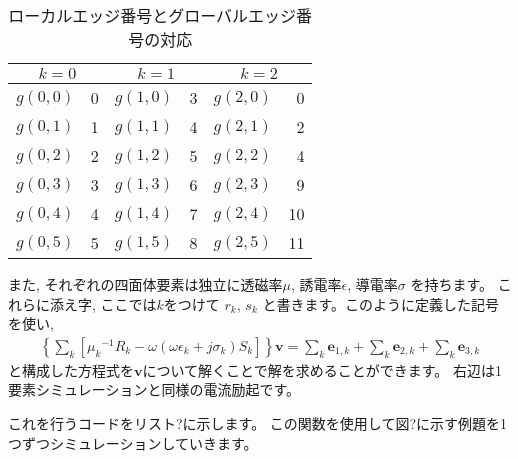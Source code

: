 \begin{table}[tbp]
\caption{ローカルエッジ番号とグローバルエッジ番号の対応}
\label{tab:local2global}
\begin{center}
\begin{tabular}{|l|r|l|r|l|r|}
\hline
\multicolumn{2}{|c|}{$k=0$}&
\multicolumn{2}{|c|}{$k=1$}&
\multicolumn{2}{|c|}{$k=2$}\\
\hline
$g(0, 0)$ & 0 & $g(1, 0)$ & 3 & $g(2, 0)$ &  0 \\
$g(0, 1)$ & 1 & $g(1, 1)$ & 4 & $g(2, 1)$ &  2 \\
$g(0, 2)$ & 2 & $g(1, 2)$ & 5 & $g(2, 2)$ &  4 \\
$g(0, 3)$ & 3 & $g(1, 3)$ & 6 & $g(2, 3)$ &  9 \\
$g(0, 4)$ & 4 & $g(1, 4)$ & 7 & $g(2, 4)$ & 10 \\
$g(0, 5)$ & 5 & $g(1, 5)$ & 8 & $g(2, 5)$ & 11 \\
\hline
\end{tabular}
\end{center}
\end{table}

また, それぞれの四面体要素は独立に透磁率$\mu$, 誘電率$\epsilon$, 導電率$\sigma$
を持ちます。
これらに添え字, ここでは$k$をつけて
$r_k$, $s_k$%
と書きます。このように定義した記号を使い,
\begin{align}
\left\{
\sum_k
\left[
{\mu_k}^{-1} R_k
-\omega\left(\omega\epsilon_k+j\sigma_k\right)S_k
\right]
\right\}
\bm{v}
=\sum_k \bm{e}_{1,k}+\sum_k\bm{e}_{2,k}+\sum_k\bm{e}_{3,k}
\end{align}
と構成した方程式を$\bm{v}$について解くことで解を求めることができます。
右辺は1要素シミュレーションと同様の電流励起です。

これを行うコードをリスト?に示します。
この関数を使用して図?に示す例題を1つずつシミュレーションしていきます。
